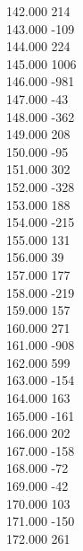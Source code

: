 { 142.000	214 \\
 143.000	-109 \\
 144.000	224 \\
 145.000	1006 \\
 146.000	-981 \\
 147.000	-43 \\
 148.000	-362 \\
 149.000	208 \\
 150.000	-95 \\
 151.000	302 \\
 152.000	-328 \\
 153.000	188 \\
 154.000	-215 \\
 155.000	131 \\
 156.000	39 \\
 157.000	177 \\
 158.000	-219 \\
 159.000	157 \\
 160.000	271 \\
 161.000	-908 \\
 162.000	599 \\
 163.000	-154 \\
 164.000	163 \\
 165.000	-161 \\
 166.000	202 \\
 167.000	-158 \\
 168.000	-72 \\
 169.000	-42 \\
 170.000	103 \\
 171.000	-150 \\
 172.000	261 \\
}
